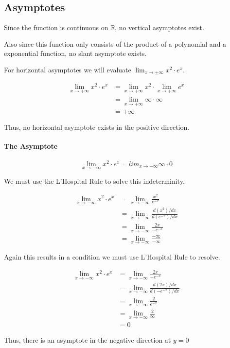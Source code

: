 \subsection{Asymptotes}

Since the function is continuous on \(\mathbb{R}\), no vertical asymptotes
exist.

Also since this function only consists of the product of a polynomial 
and a exponential function, no slant asymptote exists.

For horizontal asymptotes we will evaluate 
\(\lim_{x \rightarrow \pm\infty} {x^2\cdot e^x}\).

\[
    \begin{aligned}
        \lim_{x\rightarrow +\infty} {x^2 \cdot e^x} &
        = \lim_{x\rightarrow +\infty} {x^2} \cdot 
          \lim_{x\rightarrow +\infty} {e^x} \\
        & = \lim_{x\rightarrow +\infty} \infty \cdot \infty \\
        & = +\infty
    \end{aligned}
\]

Thus, no horizontal asymptote exists in the positive direction.

\paragraph{The Asymptote}
\[
    \lim_{x\rightarrow -\infty} {x^2 \cdot e^x}
    = lim_{x\rightarrow -\infty} {\infty\cdot 0}
\]

We must use the L'Hospital Rule to solve this indeterminity.

\[
    \begin{aligned}
        \lim_{x\rightarrow -\infty} {x^2 \cdot e^x} &
        = \lim_{x\rightarrow -\infty} \frac{x^2}{e^{-x}} \\
        & = \lim_{x\rightarrow -\infty} 
                \frac{ {d(x^2)} / {dx}}
                     { {d(e^{-x})} / {dx}} \\
        & = \lim_{x\rightarrow -\infty}
                \frac{ 2x }
                     { -e^{-x} } \\
        & = \lim_{x\rightarrow -\infty}
                \frac{-\infty}{-\infty}
    \end{aligned}
\]

Again this results in a condition we must use L'Hospital Rule to resolve.

\[
    \begin{aligned}
        \lim_{x\rightarrow -\infty} {x^2 \cdot e^x} &
        = \lim_{x\rightarrow -\infty}
                \frac{ 2x }
                     { -e^{-x} } \\
        & = \lim_{x\rightarrow -\infty}
                 \frac{d(2x)/dx}
                      {d(-e^{-x})/dx} \\
        & = \lim_{x\rightarrow -\infty}
                 \frac{2}
                      {e^{-x}} \\
        & = \lim_{x\rightarrow -\infty}
                \frac{2}
                     {\infty} \\
        & = 0
    \end{aligned}
\]

Thus, there is an asymptote in the negative direction at \(y = 0\)